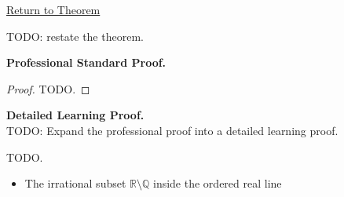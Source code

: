 \newpage
{}
\label{prf:irrationals-not-complete-as-ordered-set}

\begin{remark*}[Return]
\hyperref[thm:irrationals-not-complete-as-ordered-set]{Return to Theorem}
\end{remark*}

\begin{theorem*}
TODO: restate the theorem.
\end{theorem*}

\textbf{Professional Standard Proof.}~\\
\begin{proof}
TODO.
\end{proof}

\textbf{Detailed Learning Proof.}~\\
TODO: Expand the professional proof into a detailed learning proof.


\begin{remark*}
TODO.
\end{remark*}

\begin{dependencies}
\begin{itemize}
  \item The irrational subset $\mathbb{R}\setminus\mathbb{Q}$ inside the ordered real line
\end{itemize}
\end{dependencies}
